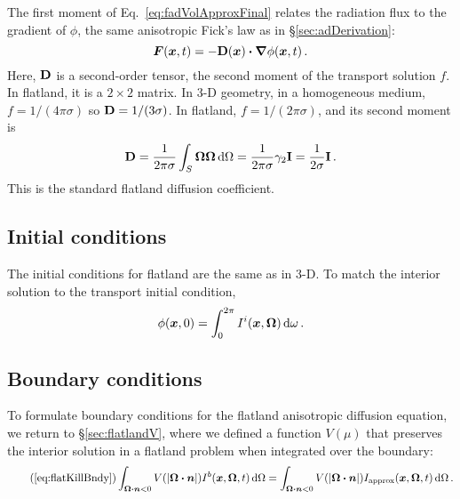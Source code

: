 The first moment of Eq.~\eqref{eq:fadVolApproxFinal} relates the radiation flux
to the gradient of $\phi$, the same anisotropic Fick's law as in
\S\ref{sec:adDerivation}:
\begin{equation}\label{eq:adFicks_6}
  \bm{F}(\bm{x},t) = - \mathbf{D}(\bm{x}) \bm{\cdot} \bm{\nabla} \phi(\bm{x},t) \,.
\end{equation}
Here, $\mathbf{D}$ is a
second-order tensor, the second moment of the transport solution $f$. In
flatland, it is a $2\times 2$ matrix. In 3-D
geometry, in a homogeneous medium, $f=1/(4\pi\sigma)$ so $\mathbf{D} = 1/(3\sigma)$.
In flatland, $f = 1/(2\pi\sigma)$, and its second moment is
\begin{equation*}
  \mathbf{D} = \frac{1}{2\pi\sigma} \int_{S}\bm{\Omega}\bm{\Omega}  \mathop{}\!\mathrm{d}\Omega
  = \frac{1}{2\pi\sigma} \gamma_2 \mathbf{I}
  = \frac{1}{2\sigma} \mathbf{I} \,.
\end{equation*}
This is the standard flatland diffusion coefficient.

\subsection{Initial conditions}
The initial conditions for flatland are the same as in 3-D. To match the
interior solution to the transport initial condition,
\begin{equation*}
  \phi(\bm{x},0) = \int_{0}^{2\pi} I^i(\bm{x},\bm{\Omega}) \mathop{}\!\mathrm{d}\omega\,.
\end{equation*}

\subsection{Boundary conditions}

To formulate boundary conditions for the flatland anisotropic diffusion
equation, we return to \S\ref{sec:flatlandV}, where we defined a
function $V(\mu)$ that preserves the interior solution in a flatland problem
when integrated over the boundary:
\begin{equation}\tag{\ref{eq:flatKillBndy}}
\int_{\vec{\Omega}\vd\vec{n} < 0} V( \abs{\vec{\Omega}\vd\vec{n}})
I^b(\vec{x}, \vec{\Omega},t) \ud\Omega
=
\int_{\vec{\Omega}\vd\vec{n} < 0} V( \abs{\vec{\Omega}\vd\vec{n}})
I_\text{approx}(\vec{x}, \vec{\Omega},t) \ud\Omega \,.
\end{equation}

